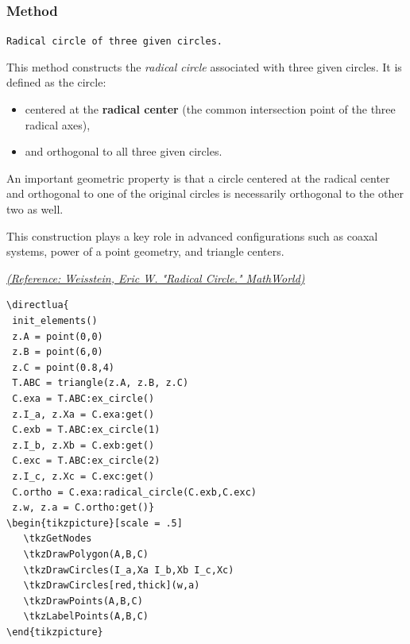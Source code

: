 \subsubsection{Method }
\label{ssub:radical_circle}

\texttt{Radical circle of three given circles.}

\medskip

This method constructs the \emph{radical circle} associated with three given circles. It is defined as the circle:

\begin{itemize}
  \item centered at the \textbf{radical center} (the common intersection point of the three radical axes),
  \item and orthogonal to all three given circles.
\end{itemize}


An important geometric property is that a circle centered at the radical center and orthogonal to one of the original circles is necessarily orthogonal to the other two as well.

\medskip

This construction plays a key role in advanced configurations such as coaxal systems, power of a point geometry, and triangle centers.
\begin{flushright}
\small
\href{https://mathworld.wolfram.com/RadicalCircle.html}{\textit{(Reference: Weisstein, Eric W. "Radical Circle." MathWorld)}}
\end{flushright}

\vspace{1em}



\begin{minipage}[t]{.5\textwidth}\vspace{0pt}%
\begin{verbatim}
\directlua{
 init_elements()
 z.A = point(0,0)
 z.B = point(6,0)
 z.C = point(0.8,4)
 T.ABC = triangle(z.A, z.B, z.C)
 C.exa = T.ABC:ex_circle()
 z.I_a, z.Xa = C.exa:get()
 C.exb = T.ABC:ex_circle(1)
 z.I_b, z.Xb = C.exb:get()
 C.exc = T.ABC:ex_circle(2)
 z.I_c, z.Xc = C.exc:get()
 C.ortho = C.exa:radical_circle(C.exb,C.exc)
 z.w, z.a = C.ortho:get()}
\begin{tikzpicture}[scale = .5]
   \tkzGetNodes
   \tkzDrawPolygon(A,B,C)
   \tkzDrawCircles(I_a,Xa I_b,Xb I_c,Xc)
   \tkzDrawCircles[red,thick](w,a)
   \tkzDrawPoints(A,B,C)
   \tkzLabelPoints(A,B,C)
\end{tikzpicture}
\end{verbatim}
\end{minipage}

